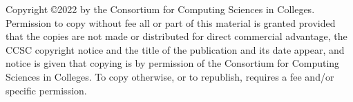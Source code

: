 Copyright \copyright 2022 by the Consortium for Computing Sciences in Colleges.
Permission to copy without fee all or part of this material is granted provided
that the copies are not made or distributed for direct commercial advantage,
the CCSC copyright notice and the title of the publication and its date appear,
and notice is given that copying is by permission of the Consortium for
Computing Sciences in Colleges.  To copy otherwise, or to republish, requires
a fee and/or specific permission.
